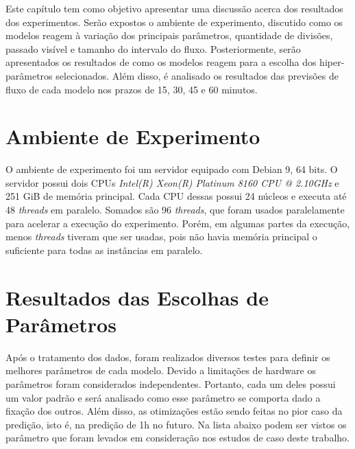 

Este capítulo tem como objetivo apresentar uma discussão acerca dos resultados dos experimentos. Serão expostos o ambiente de experimento, discutido como os modelos reagem à variação dos principais parâmetros, quantidade de divisões, passado visível e tamanho do intervalo do fluxo. Posteriormente, serão apresentados os resultados de como os modelos reagem para a escolha dos hiper-parâmetros selecionados. Além disso, é analisado os resultados das previsões de fluxo de cada modelo nos prazos de 15, 30, 45 e 60 minutos.


\section{Ambiente de Experimento}

O ambiente de experimento foi um servidor equipado com Debian 9, 64 bits. O servidor possui dois CPUs \textit{Intel(R) Xeon(R) Platinum 8160 CPU @ 2.10GHz} e 251 GiB de memória principal. Cada CPU dessas possui 24 núcleos e executa até 48 \textit{threads} em paralelo. Somados são 96 \textit{threads}, que foram usados paralelamente para acelerar a execução do experimento. Porém, em algumas partes da execução, menos \textit{threads} tiveram que ser usadas, pois não havia memória principal o suficiente para todas as instâncias em paralelo.

\section{Resultados das Escolhas de Parâmetros}
\label{section:resultados_parametros}

Após o tratamento dos dados, foram realizados diversos testes para definir os melhores parâmetros de cada modelo. Devido a limitações de hardware os parâmetros foram considerados independentes. Portanto, cada um deles possui um valor padrão e será analisado como esse parâmetro se comporta dado a fixação dos outros. Além disso, as otimizações estão sendo feitas no pior caso da predição, isto é, na predição de 1h no futuro. Na lista abaixo podem ser vistos os parâmetro que foram levados em consideração nos estudos de caso deste trabalho.

